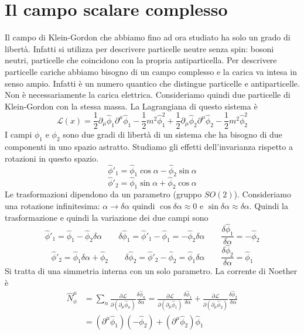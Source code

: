 \section{Il campo scalare complesso}
Il campo di Klein-Gordon che abbiamo fino ad ora studiato ha solo un grado di libertà. Infatti si utilizza per descrivere particelle neutre senza spin: bosoni neutri, particelle che coincidono con la propria antiparticella. Per descrivere particelle cariche abbiamo bisogno di un campo complesso e la carica va intesa in senso ampio. Infatti è un numero quantico che distingue particelle e antiparticelle. Non è necessariamente la carica elettrica. Consideriamo quindi due particelle di Klein-Gordon con la stessa massa. La Lagrangiana di questo sistema è
$$
\mathcal{L}(x) = \frac{1}{2}\partial_\mu\hat{\phi}_1\partial^\mu\hat{\phi}_1 - \frac{1}{2}m^2\hat{\phi}_1^2 + \frac{1}{2}\partial_\mu\hat{\phi}_2\partial^\mu\hat{\phi}_2 - \frac{1}{2}m^2\hat{\phi}_2^2
$$
I campi $\phi_1$ e $\phi_2$ sono due gradi di libertà di un sistema che ha bisogno di due componenti in uno spazio astratto. Studiamo gli effetti dell'invarianza rispetto a rotazioni in questo spazio.
$$
\hat{\phi}'_1 = \hat{\phi}_1 \cos\alpha - \hat{\phi}_2 \sin\alpha
$$
$$
\hat{\phi}'_2 = \hat{\phi}_1 \sin\alpha + \hat{\phi}_2 \cos\alpha
$$
Le trasformazioni dipendono da un parametro (gruppo $SO(2)$). Consideriamo una rotazione infinitesima: $\alpha\to\delta\alpha$ quindi $\cos{\delta\alpha}\approx0$ e $\sin{\delta\alpha}\approx\delta\alpha$. Quindi la trasformazione e quindi la variazione dei due campi sono
$$
\hat{\phi}'_1 = \hat{\phi}_1 - \hat{\phi}_2\delta\alpha \qquad \delta\hat{\phi}_1 = \hat{\phi}'_1 - \hat{\phi}_1 = -\hat{\phi}_2\delta\alpha \qquad \frac{\delta\hat{\phi}_1}{\delta\alpha} = -\hat{\phi}_2
$$
$$
\hat{\phi}'_2 = \hat{\phi}_1\delta\alpha + \hat{\phi}_2 \qquad \delta\hat{\phi}_2 = \hat{\phi}'_2 - \hat{\phi}_2 = \hat{\phi}_1\delta\alpha \qquad \frac{\delta\hat{\phi}_2}{\delta\alpha} = \hat{\phi}_1
$$
Si tratta di una simmetria interna con un solo parametro. La corrente di Noether è
\begin{align*}
\hat{N}^\mu_\phi &= \sum_n \frac{\partial\mathcal{L}}{\partial(\partial_\mu\hat{\phi}_n)} \frac{\delta\hat{\phi}_n}{\delta\alpha} = \frac{\partial\mathcal{L}}{\partial(\partial_\mu\hat{\phi}_1)} \frac{\delta\hat{\phi}_1}{\delta\alpha} + \frac{\partial\mathcal{L}}{\partial(\partial_\mu\hat{\phi}_2)} \frac{\delta\hat{\phi}_2}{\delta\alpha} \\
&= (\partial^\mu\hat{\phi}_1)(-\hat{\phi}_2) + (\partial^\mu\hat{\phi}_2)\hat{\phi}_1
\end{align*}
